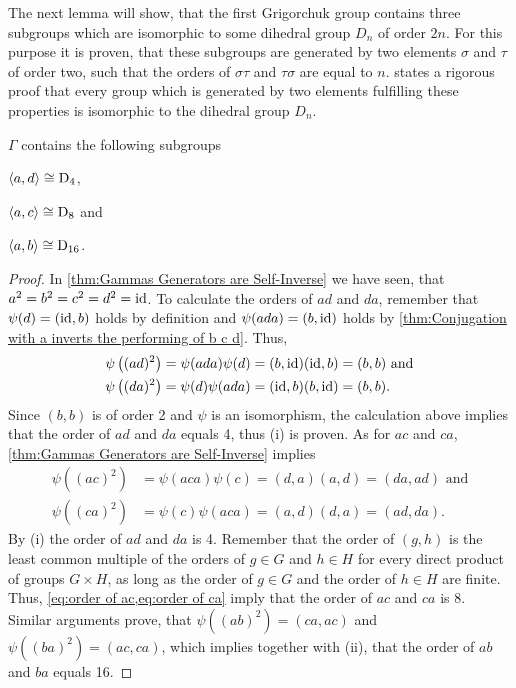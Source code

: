 The next lemma will show, that the first Grigorchuk group contains three subgroups which are isomorphic to some dihedral group $D_n$ of order $2n$. For this purpose it is proven, that these subgroups are generated by two elements $\sigma$ and $\tau$ of order two, such that the orders of $\sigma\tau$ and $\tau\sigma$ are equal to $n$. \textcite[Thm. 6.8]{suzuki1982group} states a rigorous proof that every group which is generated by two elements fulfilling these properties is isomorphic to the dihedral group $D_n$.
\begin{lem}\label{thm:Dihedral groups in Gamma}
$\Gamma$ contains the following subgroups
\begin{thmlist}
\item $\langle a,d\rangle\cong\operatorname{\mathrm{D}}_4$,\label{thm:D4}
\item $\langle a,c\rangle\cong\operatorname{\mathrm{D}}_8$ and
\item $\langle a,b\rangle\cong\operatorname{\mathrm{D}}_{16}$.\label{thm:D16}
\end{thmlist}
\end{lem}
\begin{proof}
In \cref{thm:Gammas Generators are Self-Inverse} we have seen, that $a^2=b^2=c^2=d^2=\operatorname{id}$. To calculate the orders of $ad$ and $da$, remember that $\psi(d)=(\operatorname{id},b)$ holds by definition and $\psi(ada)=(b,\operatorname{id})$ holds by \cref{thm:Conjugation with a inverts the performing of b c d}. Thus,
\begin{align*}
\psi\left((ad)^2\right)&=\psi(ada)\psi(d)=(b,\operatorname{id})(\operatorname{id},b)=(b,b) \text{ and}\\
\psi\left((da)^2\right)&=\psi(d)\psi(ada)=(\operatorname{id},b)(b,\operatorname{id})=(b,b).
\end{align*}
Since $(b,b)$ is of order 2 and $\psi$ is an isomorphism, the calculation above implies that the order of $ad$ and $da$ equals 4, thus (i) is proven. As for $ac$ and $ca$, \cref{thm:Gammas Generators are Self-Inverse} implies
\begin{align}
\psi\left((ac)^2\right)&=\psi(aca)\psi(c)=(d,a)(a,d)=(da,ad) \text{ and}\label{eq:order of ac} \\ 
\psi\left((ca)^2\right)&=\psi(c)\psi(aca)=(a,d)(d,a)=(ad,da).\label{eq:order of ca}
\end{align} 
By (i) the order of $ad$ and $da$ is 4. Remember that the order of $(g,h)$ is the least common multiple of the orders of $g\in G$ and $h\in H$ for every direct product of groups $G\times H$, as long as the order of $g\in G$ and the order of $h\in H$ are finite. Thus, \cref{eq:order of ac,eq:order of ca} imply that the order of $ac$ and $ca$ is 8. Similar arguments prove, that $\psi\left((ab)^2\right)=(ca,ac)$ and $\psi\left((ba)^2\right)=(ac,ca)$, which implies together with (ii), that the order of $ab$ and $ba$ equals 16. 
\end{proof}
